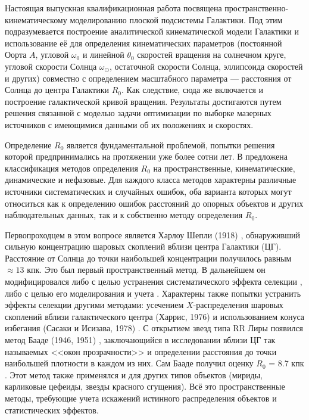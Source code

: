 \documentclass[a4paper, oneside, 14pt]{article}
\begin{document}
Настоящая выпускная квалификационная работа посвящена пространственно-кинематическому моделированию плоской подсистемы Галактики. Под этим подразумевается построение аналитической кинематической модели Галактики и использование её для определения кинематических параметров (постоянной Оорта $ A $, угловой $ \omega_0 $ и линейной $ \theta_0 $ скоростей вращения на солнечном круге, угловой скорости Солнца $ \omega_\odot $, остаточной скорости Солнца, эллипсоида скоростей и других) совместно с определением масштабного параметра --- расстояния от Солнца до центра Галактики $ R_0 $. Как следствие, сюда же включается и построение галактической кривой вращения. Результаты достигаются путем решения связанной с моделью задачи оптимизации по выборке мазерных источников с имеющимися данными об их положениях и скоростях.

Определение $ R_0 $ является фундаментальной проблемой, попытки решения которой предпринимались на протяжении уже более сотни лет. В \cite{N.2003, N.2004} предложена классификация методов определения $ R_0 $ на пространственные, кинематические, динамические и нефазовые. Для каждого класса методов характерны различные источники систематических и случайных ошибок, оба варианта которых могут относиться как к определению ошибок расстояний до опорных объектов и других наблюдательных данных, так и к собственно методу определения $ R_0 $.

Первопроходцем в этом вопросе является Харлоу Шепли (1918) \cite{S.1918}, обнаруживший сильную концентрацию шаровых скоплений вблизи центра Галактики (ЦГ). Расстояние от Солнца до точки наибольшей концентрации получилось равным ${}\approx13$ кпк. Это был первый пространственный метод. В дальнейшем он модифицировался либо с целью устранения систематического эффекта селекции \cite{W.1975, F.W.1982, R.H.1989}, либо с целью его моделирования и учета \cite{R.P.D.F.1994}. Характерны также попытки устранить эффекты селекции другими методами: усечением $X$-распределения шаровых скоплений вблизи галактического центра (Харрис, 1976) \cite{H.1976} и использованием конуса избегания (Сасаки и Исизава, 1978) \cite{S.I.1978}. С открытием звезд типа RR Лиры появился метод Бааде (1946, 1951) \cite{B.1946, B.1951}, заключающийся в исследовании вблизи ЦГ так называемых <<окон прозрачности>> и определении расстояния до точки наибольшей плотности в каждом из них. Сам Бааде получил оценку $ R_0 $ = 8.7 кпк \cite{B.1951}. Этот метод также применялся и для других типов объектов (мириды, карликовые цефеиды, звезды красного сгущения). Всё это пространственные методы, требующие учета искажений истинного распределения объектов и статистических эффектов.
\end{document}
